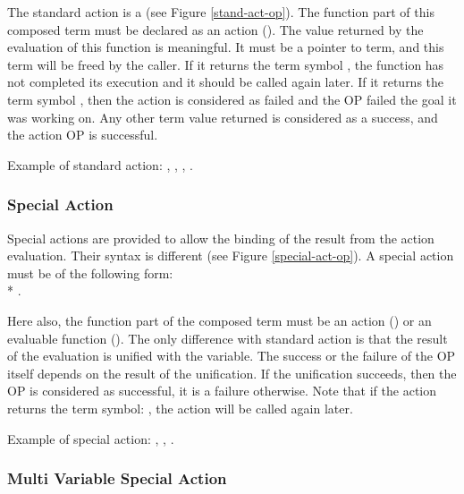 The standard action is a  (see Figure
\ref{stand-act-op}).  The function part of this composed term must be
declared as an action (). The value
returned by the evaluation of this function is meaningful. It must be a
pointer to term, and this term will be freed by the caller. If it returns
the term symbol , the function has not completed its execution
and it should be called again later.  If it returns the term symbol
, then the action is considered as failed and the OP failed the
goal it was working on. Any other term value returned is considered as a
success, and the action OP is successful.

Example of standard action: , , , .

\subsubsection{Special Action}

Special actions are provided to allow the binding of the result from the
action evaluation. Their syntax is different (see Figure
\ref{special-act-op}). A special action must be of the following form: \\*
.


Here also, the function part of the composed term must be an action
() or an evaluable function ().  The only difference with standard action is that the result
of the evaluation is unified with the variable. The success or the failure
of the OP itself depends on the result of the unification. If the
unification succeeds, then the OP is considered as successful, it is a
failure otherwise. Note that if the action returns the term symbol:
, the action will be called again later.

Example of special action: , , .

\subsubsection{Multi Variable Special Action}

